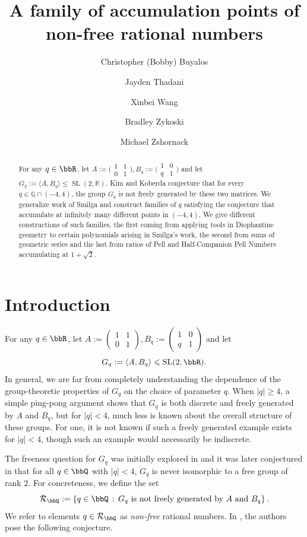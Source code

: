 \documentclass[11 pt]{amsart}
\title{A family of accumulation points of non-free rational numbers}
\author{Christopher (Bobby) Buyalos}
\author{Jayden Thadani}
\author{Xinbei Wang}
\author{Bradley Zykoski}
\author{Michael Zshornack}
\begin{document}
\begin{abstract}
    For any $q\in\bbR$, let $A:=\big(\begin{smallmatrix}1 & 1\\0 & 1\end{smallmatrix}\big), B_q:=\big(\begin{smallmatrix}1 & 0\\q & 1\end{smallmatrix}\big)$ and let $G_q:=\langle A,B_q\rangle\leqslant\operatorname{SL}(2,\mathbb{R})$. Kim and Koberda conjecture that for every $q\in\mathbb{Q}\cap(-4,4)$, the group $G_q$ is not freely generated by these two matrices. We generalize work of Smilga and construct families of $q$ satisfying the conjecture that accumulate at infinitely many different points in $(-4,4)$. We give different constructions of such families, the first coming from applying tools in Diophantine geometry to certain polynomials arising in Smilga's work, the second from sums of geometric series and the last from ratios of Pell and Half-Companion Pell Numbers accumulating at $1+\sqrt{2}$.
\end{abstract}

\maketitle

\section{Introduction}
For any $q\in\bbR$, let $A:=\left(\begin{smallmatrix}1 & 1\\0 & 1\end{smallmatrix}\right), B_q:=\left(\begin{smallmatrix}1 & 0\\q & 1\end{smallmatrix}\right)$ and let
\[
G_q :=\langle A, B_q\rangle\leqslant\operatorname{SL}(2,\bbR).
\]
In general, we are far from completely understanding the dependence of the group-theoretic properties of $G_q$ on the choice of parameter $q$. When $|q|\geq 4$, a simple ping-pong argument shows that $G_q$ is both discrete and freely generated by $A$ and $B_q$, but for $|q|<4$, much less is known about the overall structure of these groups. For one, it is not known if such a freely generated example exists for $|q|<4$, though such an example would necessarily be indiscrete.

The freeness question for $G_q$ was initially explored in \cite{Lyndon_Ullman_1969} and it was later conjectured in \cite{kimkoberda} that for all $q\in\bbQ$ with $|q|<4$, $G_q$ is never isomorphic to a free group of rank $2$. For concreteness, we define the set
\[
\mathcal{R}_\bbQ:=\left\{q\in\bbQ\,:\,G_q\textrm{ is not freely generated by }A\textrm{ and }B_q\right\}.
\]
We refer to elements $q\in\mathcal{R}_\bbQ$ as \textit{non-free} rational numbers. In \cite{kimkoberda}, the authors pose the following conjecture.
\end{document}
